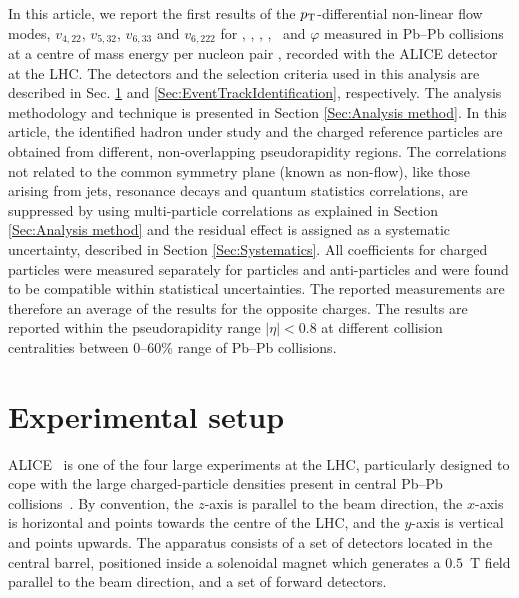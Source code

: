 \documentclass[ALICE,manyauthors]{cernphprep}
\begin{document}
In this article, we report the first results of the $p_{\rm{T}}$-differential non-linear flow modes, $v_{4,22}$, $v_{5,32}$, $v_{6,33}$ and $v_{6,222}$ for \pion, \kaon, \Ks, \proton, \lambdas~and $\varphi$ measured in Pb--Pb collisions at a centre of mass energy per nucleon pair \sNN, recorded with the ALICE detector \cite{Aamodt:2008zz} at the LHC. The detectors and the selection criteria used in  this analysis are described in Sec. \ref{Sec:ExpSetup} and \ref{Sec:EventTrackIdentification}, respectively. %
The analysis methodology and technique is presented in Section \ref{Sec:Analysis method}. In this article, the identified hadron under study and the charged reference particles are obtained from different, non-overlapping pseudorapidity regions. The correlations not related to the common symmetry plane (known as non-flow), like those arising from jets, resonance decays and quantum statistics correlations, are suppressed by using multi-particle correlations as explained in Section \ref{Sec:Analysis method} and the residual effect is assigned as a systematic uncertainty, described in Section \ref{Sec:Systematics}. All coefficients for charged particles were measured separately for particles and anti-particles and were found to be compatible within statistical uncertainties. The reported measurements are therefore an average of the results for the opposite charges. The results are reported within the pseudorapidity range $|\eta|<0.8$ at different collision centralities between 0--60\% range of Pb--Pb collisions. 






\section{Experimental setup}
\label{Sec:ExpSetup}
ALICE~\cite{Aamodt:2008zz,Abelev:2014ffa} is one of the four large experiments at the LHC, particularly designed to cope with the large charged-particle densities present in central Pb--Pb collisions~\cite{Aamodt:2010pb}. By convention, the $z$-axis is parallel to the beam direction, the $x$-axis is horizontal and points towards the centre of the LHC, and the $y$-axis is vertical and points upwards. The apparatus consists of a set of detectors located in the central barrel, positioned inside a solenoidal magnet which generates a $0.5$~T field parallel to the beam direction, and a set of forward detectors. 
\end{document}

